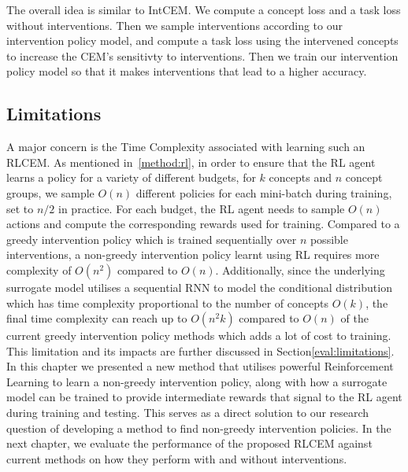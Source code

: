 The overall idea is similar to IntCEM. We compute a concept loss
and a task loss without interventions.
Then we sample interventions according to our intervention policy model,
and compute a task loss using the intervened concepts to increase 
the CEM's sensitivty to interventions. Then we train our intervention policy
model so that it makes interventions that lead to a higher accuracy.

\subsection{Limitations}

A major concern is the Time Complexity associated with learning
such an RLCEM. As mentioned in~\ref{method:rl}, in order to ensure
that the RL agent learns a policy for a variety of different budgets,
for $k$ concepts and $n$ concept groups,
 we sample $O(n)$ different policies for each mini-batch during training, set 
to $n/2$ in practice. For each budget, the RL agent needs to sample
$O(n)$ actions and compute the corresponding rewards used for training. 
Compared to
a greedy intervention policy which is trained sequentially over
$n$ possible interventions, 
a non-greedy intervention policy learnt using
RL requires more complexity of $O(n^2)$ compared to $O(n)$.
Additionally, since the underlying surrogate model utilises a sequential
RNN to model the conditional distribution which has time complexity
proportional to the number of concepts $O(k)$, the final 
time complexity can reach up to $O(n^2k)$ compared to $O(n)$ of the current
greedy intervention policy methods which adds a lot of cost to training.
This limitation
and its impacts
are further discussed in Section\ref{eval:limitations}.\\

In this chapter we presented a new method 
that utilises powerful Reinforcement Learning
to learn a non-greedy intervention policy,
along with how a surrogate model can be trained to 
provide intermediate rewards that signal to the RL agent during
training and testing.
This serves as a direct solution to our research question of 
developing a method to find non-greedy intervention policies.
In the next chapter, we evaluate the performance of the proposed
RLCEM against current methods on how
they perform with and without interventions.


